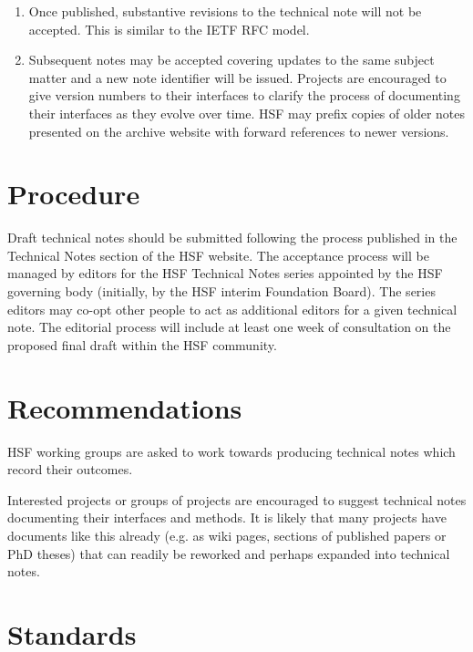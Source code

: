 \documentclass[12pt,a4paper]{article}
\begin{document}
\begin{enumerate}
\item Once published, substantive revisions to the technical note will not 
be accepted. This is similar to the IETF RFC model\cite{IETF-RFC}. 

\item Subsequent notes may be accepted
covering updates to the same subject matter 
and a new note identifier will be issued. Projects are encouraged
to give version numbers to their interfaces to clarify the process of
documenting their interfaces as they evolve over time. HSF may prefix copies 
of older notes presented on the archive website with 
forward references to newer versions.

\end{enumerate}

\section{Procedure}
\label{sec:Procedure}

Draft technical notes should be submitted following the process published in
the Technical Notes section of the HSF website. 
The acceptance process will be managed by editors for the HSF Technical 
Notes series appointed by the HSF governing body (initially, by the HSF
interim Foundation Board). The series editors may co-opt
other people to act as additional editors for a given technical note.
The editorial process will include at least one week of consultation
on the proposed final draft within the HSF community.

\section{Recommendations}
\label{sec:Recommendations}

HSF working groups are asked to work towards producing technical notes which
record their outcomes.

Interested projects or groups of projects are encouraged to suggest 
technical notes documenting their interfaces and methods. It is likely that
many projects have documents like this already (e.g. as wiki pages, sections
of published papers or PhD theses) that can readily be reworked and
perhaps expanded into technical notes. 

\section{Standards}
\label{sec:Standards}
\end{document}
